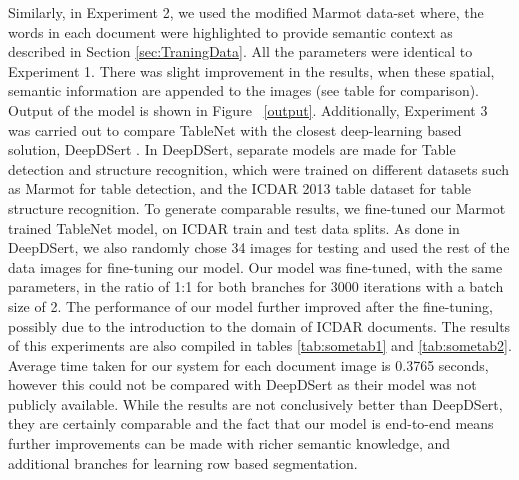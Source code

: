 \documentclass[conference]{IEEEtran}
\begin{document}
Similarly, in Experiment 2, we used the modified Marmot data-set where, the words in each document were highlighted to provide semantic context as described in Section \ref{sec:TraningData}. All the parameters were identical to Experiment 1. There was slight improvement in the results, when these spatial, semantic information are appended to the images  (see table for comparison). Output of the model is shown in Figure ~\ref{output}. Additionally, Experiment 3 was carried out to compare TableNet with the closest deep-learning based solution, DeepDSert \cite{schreiber}. In DeepDSert, separate models are made for Table detection and structure recognition, which were trained on different datasets such as Marmot for table detection, and the ICDAR 2013 table dataset for table structure recognition. To generate comparable results, we fine-tuned our Marmot trained TableNet model, on ICDAR train and test data splits. As done in DeepDSert, we also randomly chose 34 images for testing and used the rest of the data images for fine-tuning our model. Our model was fine-tuned, with the same parameters, in the ratio of 1:1 for both branches for 3000 iterations with a batch size of 2. The performance of our model further improved after the fine-tuning, possibly due to the introduction to the domain of ICDAR documents. The results of this experiments are also compiled in tables \ref{tab:sometab1} and \ref{tab:sometab2}. Average time taken for our system for each document image is 0.3765 seconds, however this could not be compared with DeepDSert as their model was not publicly available. While the results are not conclusively better than DeepDSert, they are certainly comparable and the fact that our model is end-to-end means further improvements can be made with richer semantic knowledge, and additional branches for learning row based segmentation.  
\end{document}

